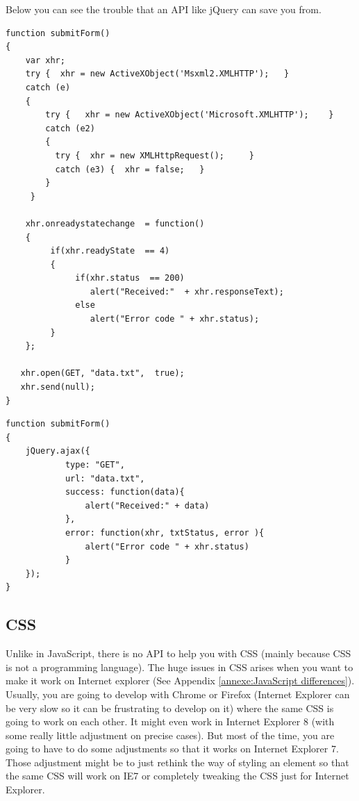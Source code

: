 Below you can see the trouble that an API like jQuery can save you from.

\lstset{language=Javascript}
\begin{lstlisting}[label=ajax,caption=Ajax without jQuery]
function submitForm()
{ 
    var xhr; 
    try {  xhr = new ActiveXObject('Msxml2.XMLHTTP');   }
    catch (e) 
    {
        try {   xhr = new ActiveXObject('Microsoft.XMLHTTP');    }
        catch (e2) 
        {
          try {  xhr = new XMLHttpRequest();     }
          catch (e3) {  xhr = false;   }
        }
     }
  
    xhr.onreadystatechange  = function()
    { 
         if(xhr.readyState  == 4)
         {
              if(xhr.status  == 200) 
                 alert("Received:"  + xhr.responseText); 
              else 
                 alert("Error code " + xhr.status);
         }
    }; 

   xhr.open(GET, "data.txt",  true); 
   xhr.send(null); 
} 
\end{lstlisting}


\lstset{language=Javascript}
\begin{lstlisting}[label=ajax-jQuery,caption=Ajax with jQuery]
function submitForm()
{ 
    jQuery.ajax({
			type: "GET",
			url: "data.txt",
			success: function(data){
				alert("Received:" + data)
			},
			error: function(xhr, txtStatus, error ){
				alert("Error code " + xhr.status)	
			}    
    });
} 
\end{lstlisting}

\subsection{CSS}

Unlike in JavaScript, there is no API to help you with CSS (mainly because CSS is not a programming language). The huge issues in CSS arises when you want to make it work on Internet explorer (See Appendix \ref{annexe:JavaScript differences}). Usually, you are going to develop with Chrome or Firefox (Internet Explorer can be very slow so it can be frustrating to develop on it) where the same CSS is going to work on each other. It might even work in Internet Explorer 8 (with some really little adjustment on precise cases). But most of the time, you are going to have to do some adjustments so that it works on Internet Explorer 7. Those adjustment might be to just rethink the way of styling an element so that the same CSS will work on IE7 or completely tweaking the CSS just for Internet Explorer.


